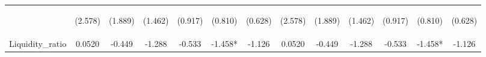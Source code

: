 \documentclass[]{article}
\begin{document}
\begin{center}
\begin{tabular}{lcccccccccccc}
\vspace{4pt} & \begin{footnotesize}(2.578)\end{footnotesize} & \begin{footnotesize}(1.889)\end{footnotesize} & \begin{footnotesize}(1.462)\end{footnotesize} & \begin{footnotesize}(0.917)\end{footnotesize} & \begin{footnotesize}(0.810)\end{footnotesize} & \begin{footnotesize}(0.628)\end{footnotesize} & \begin{footnotesize}(2.578)\end{footnotesize} & \begin{footnotesize}(1.889)\end{footnotesize} & \begin{footnotesize}(1.462)\end{footnotesize} & \begin{footnotesize}(0.917)\end{footnotesize} & \begin{footnotesize}(0.810)\end{footnotesize} & \begin{footnotesize}(0.628)\end{footnotesize} \\
Liquidity\_ratio & 0.0520 & -0.449 & -1.288 & -0.533 & -1.458* & -1.126 & 0.0520 & -0.449 & -1.288 & -0.533 & -1.458* & -1.126 \\

\end{tabular}
\end{center}
\end{document}
